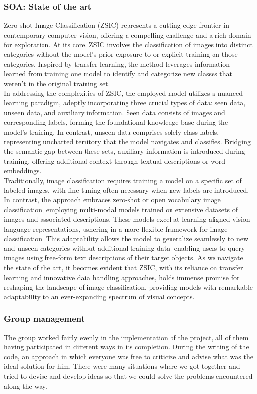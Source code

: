 \documentclass[12pt,a4paper,twoside]{article}
\begin{document}
\subsubsection{SOA: State of the art}
Zero-shot Image Classification (ZSIC) represents a cutting-edge frontier in contemporary computer vision, offering a compelling challenge and a rich domain for exploration. At its core, ZSIC involves the classification of images into distinct categories without the model's prior exposure to or explicit training on those categories. Inspired by transfer learning, the method leverages information learned from training one model to identify and categorize new classes that weren't in the original training set. \\
In addressing the complexities of ZSIC, the employed model utilizes a nuanced learning paradigm, adeptly incorporating three crucial types of data: seen data, unseen data, and auxiliary information. Seen data consists of images and corresponding labels, forming the foundational knowledge base during the model's training. In contrast, unseen data comprises solely class labels, representing uncharted territory that the model navigates and classifies. Bridging the semantic gap between these sets, auxiliary information is introduced during training, offering additional context through textual descriptions or word embeddings.\\ 
Traditionally, image classification requires training a model on a specific set of labeled images, with fine-tuning often necessary when new labels are introduced. In contrast, the approach embraces zero-shot or open vocabulary image classification, employing multi-modal models trained on extensive datasets of images and associated descriptions. These models excel at learning aligned vision-language representations, ushering in a more flexible framework for image classification. This adaptability allows the model to generalize seamlessly to new and unseen categories without additional training data, enabling users to query images using free-form text descriptions of their target objects. As we navigate the state of the art, it becomes evident that ZSIC, with its reliance on transfer learning and innovative data handling approaches, holds immense promise for reshaping the landscape of image classification, providing models with remarkable adaptability to an ever-expanding spectrum of visual concepts.
\subsubsection{Group management}
The group worked fairly evenly in the implementation of the project, all of them having 
participated in different ways in its completion. During the writing of the code, an approach in which everyone was free to criticize and advise what was the ideal solution for him. There were many situations where we got together and tried to devise and develop ideas so that we could 
solve the problems encountered along the way.
\end{document}
